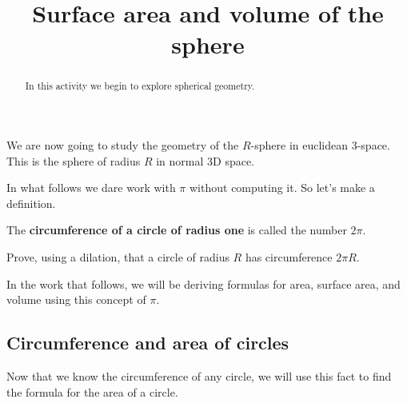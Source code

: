 \documentclass[hints,handout,noauthor,nooutcomes,12pt,newpage]{ximera}
\title{Surface area and volume of the sphere}
\begin{document}
\begin{abstract}
In this activity we begin to explore spherical geometry.
\end{abstract}
\maketitle


We are now going to study the geometry of the $R$-sphere in euclidean
$3$-space. This is the sphere of radius $R$ in normal $3$D space.



In what follows we dare work with $\pi$ without computing it. So let's make a definition.

  


\begin{definition}
  The \textbf{circumference of a circle of radius one} is called the number $2\pi$.
\end{definition}


\begin{problem}
  Prove, using a dilation, that a circle of radius $R$ has
  circumference $2\pi R$.
\end{problem}


In the work that follows, we will be deriving formulas for area,
surface area, and volume using this concept of $\pi$.




\subsection{Circumference and area of circles}

Now that we know the circumference of any circle, we will use this
fact to find the formula for the area of a circle. 
\end{document}
